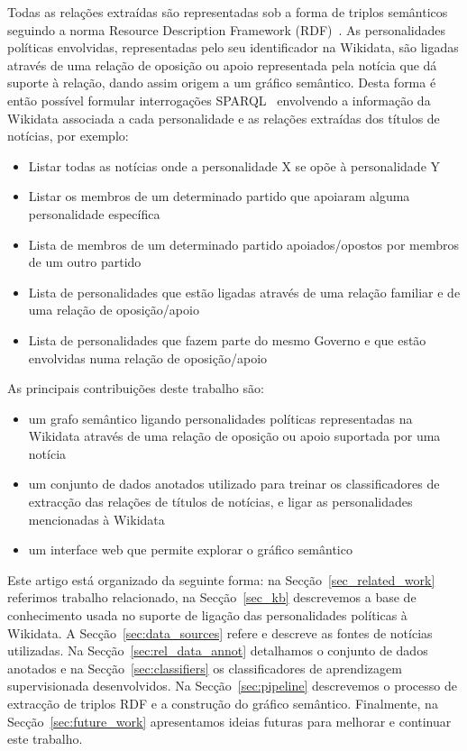 \documentclass[a4paper, twocolumn, 11pt, twoside]{article}
\begin{document}
Todas as relações extraídas são representadas sob a forma de triplos semânticos seguindo a norma Resource Description Framework (RDF)~\citep{schreiber2014primer}. As personalidades políticas envolvidas, representadas pelo seu identificador na Wikidata, são ligadas através de uma relação de oposição ou apoio representada pela notícia que dá suporte à relação, dando assim origem a um gráfico semântico. Desta forma é então possível formular interrogações SPARQL~\citep{2013sparql} envolvendo a informação da Wikidata associada a cada personalidade e as relações extraídas dos títulos de notícias, por exemplo:

\begin{itemize}
\item{Listar todas as notícias onde a personalidade X se opõe à personalidade Y}
\item{Listar os membros de um determinado partido que apoiaram alguma personalidade específica}
\item{Lista de membros de um determinado partido apoiados/opostos por membros de um outro partido}
\item{Lista de personalidades que estão ligadas através de uma relação familiar e de uma relação de oposição/apoio}
\item{Lista de personalidades que fazem parte do mesmo Governo e que estão envolvidas numa relação de oposição/apoio}
\end{itemize}

As principais contribuições deste trabalho são: 

\begin{itemize}
\item{um grafo semântico ligando personalidades políticas representadas na Wikidata através de uma relação de oposição ou apoio suportada por uma notícia}
\item{um conjunto de dados anotados utilizado para treinar os classificadores de extracção das relações de títulos de notícias, e ligar as personalidades mencionadas à Wikidata}
\item{um interface web que permite explorar o gráfico semântico}
\end{itemize}

Este artigo está organizado da seguinte forma: na Secção~\ref{sec_related_work} referimos trabalho relacionado, na Secção~\ref{sec_kb} descrevemos a base de conhecimento usada no suporte de ligação das personalidades políticas à Wikidata. A Secção~\ref{sec:data_sources} refere e descreve as fontes de notícias utilizadas. Na Secção~\ref{sec:rel_data_annot} detalhamos o conjunto de dados anotados e na Secção~\ref{sec:classifiers} os classificadores de aprendizagem supervisionada desenvolvidos. Na Secção~\ref{sec:pipeline} descrevemos o processo de extracção de triplos RDF e a construção do gráfico semântico. Finalmente, na Secção~\ref{sec:future_work} apresentamos ideias futuras para melhorar e continuar este trabalho.
\end{document}
